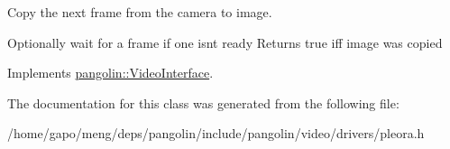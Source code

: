 Copy the next frame from the camera to image. 

Optionally wait for a frame if one isn\textquotesingle{}t ready Returns true iff image was copied 

Implements \hyperlink{structpangolin_1_1_video_interface_a2a87c2219959a762dbbb43760d27ff27}{pangolin\+::\+Video\+Interface}.



The documentation for this class was generated from the following file\+:\begin{DoxyCompactItemize}
\item 
/home/gapo/meng/deps/pangolin/include/pangolin/video/drivers/pleora.\+h\end{DoxyCompactItemize}
